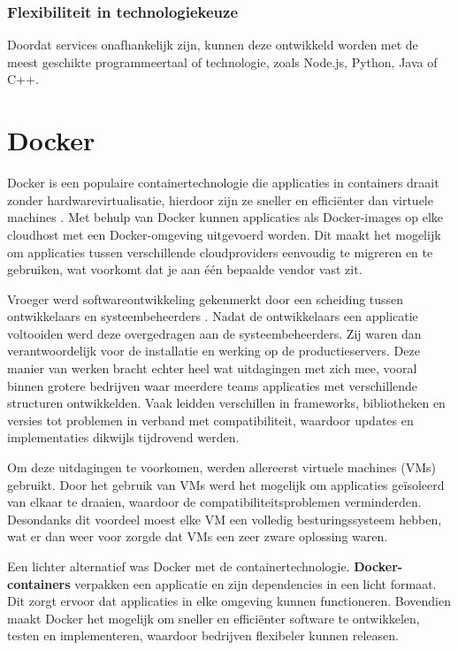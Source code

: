 \subsubsection{Flexibiliteit in technologiekeuze}
\label{sec:flexibiliteit_technologiekeuze}

Doordat services onafhankelijk zijn, kunnen deze ontwikkeld worden met de meest geschikte programmeertaal of technologie, zoals Node.js, Python, Java of C++.

\section{Docker}

Docker is een populaire containertechnologie die applicaties in containers draait zonder hardwarevirtualisatie, hierdoor zijn ze sneller en efficiënter dan virtuele machines \autocite{Kim2022}. Met behulp van Docker kunnen applicaties als Docker-images op elke cloudhost met een Docker-omgeving uitgevoerd worden. Dit maakt het mogelijk om applicaties tussen verschillende cloudproviders eenvoudig te migreren en te gebruiken, wat voorkomt dat je aan één bepaalde vendor vast zit.\newline

Vroeger werd softwareontwikkeling gekenmerkt door een scheiding tussen ontwikkelaars en systeembeheerders \autocite{Schenker2023}. Nadat de ontwikkelaars een applicatie voltooiden werd deze overgedragen aan de systeembeheerders. Zij waren dan verantwoordelijk voor de installatie en werking op de productieservers. Deze manier van werken bracht echter heel wat uitdagingen met zich mee, vooral binnen grotere bedrijven waar meerdere teams applicaties met verschillende structuren ontwikkelden. Vaak leidden verschillen in frameworks, bibliotheken en versies tot problemen in verband met compatibiliteit, waardoor updates en implementaties dikwijls tijdrovend werden.

Om deze uitdagingen te voorkomen, werden allereerst virtuele machines (VMs) gebruikt. Door het gebruik van VMs werd het mogelijk om applicaties geïsoleerd van elkaar te draaien, waardoor de compatibiliteitsproblemen verminderden. Desondanks dit voordeel moest elke VM een volledig besturingssysteem hebben, wat er dan weer voor zorgde dat VMs een zeer zware oplossing waren.

Een lichter alternatief was Docker met de containertechnologie. \textbf{Docker-containers} verpakken een applicatie en zijn dependencies in een licht formaat. Dit zorgt ervoor dat applicaties in elke omgeving kunnen functioneren. Bovendien maakt Docker het mogelijk om sneller en efficiënter software te ontwikkelen, testen en implementeren, waardoor bedrijven flexibeler kunnen releasen.\newline

